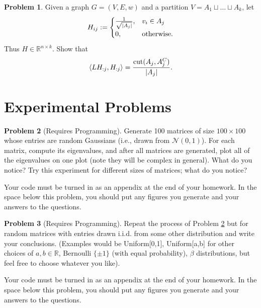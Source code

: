 \documentclass{amsart}[11pt]
\theoremstyle{definition}
\newtheorem{problem}{Problem}
\newcommand{\R}{\mathbb{R}}
\newcommand{\bracket}[1]{\left\langle#1\right\rangle}
\begin{document}
\begin{problem}
Given a graph $G=(V,E,w)$ and a partition $V = A_1\sqcup\dots\sqcup A_k$, let
\[H_{ij}:=\begin{cases} \frac{1}{\sqrt{|A_j|}}, & v_i\in A_j\\ 0, & \textnormal{otherwise}.\end{cases}\]
Thus $H\in\R^{n\times k}$. Show that \[\bracket{LH_{:j},H_{:j}} = \frac{\textnormal{cut}(A_j,A_j^C)}{|A_j|}.\]
\end{problem}

\section{Experimental Problems}

\begin{problem}[Requires Programming]\label{PROB:GaussianSpectrum}
Generate 100 matrices of size $100\times 100$ whose entries are random Gaussians (i.e., drawn from $\mathcal{N}(0,1)$).  For each matrix, compute its eigenvalues, and after all matrices are generated, plot all of the eigenvalues on one plot (note they will be complex in general).  What do you notice?  Try this experiment for different sizes of matrices; what do you notice?

Your code must be turned in as an appendix at the end of your homework. In the space below this problem, you should put any figures you generate and your answers to the questions.
\end{problem}

\begin{problem}[Requires Programming]\label{PROB:RandomSpectrum}
Repeat the process of Problem \ref{PROB:GaussianSpectrum} but for random matrices with entries drawn i.i.d. from some other distribution and write your conclusions. (Examples would be Uniform[0,1], Uniform[a,b] for other choices of $a, b\in\R$, Bernoulli $\{\pm1\}$ (with equal probability), $\beta$ distributions, but feel free to choose whatever you like).

Your code must be turned in as an appendix at the end of your homework. In the space below this problem, you should put any figures you generate and your answers to the questions.
\end{problem}
\end{document}
